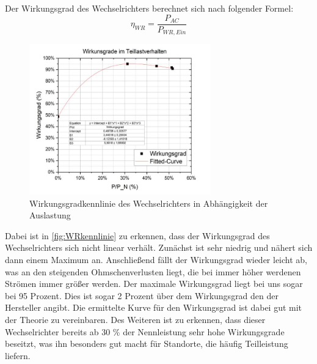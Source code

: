 Der Wirkungsgrad des Wechselrichters berechnet sich nach folgender Formel:
%
\begin{equation}
	\eta_{ WR} = \frac{ P_{AC} }{ P_{WR,Ein} }
	\label{eq:230509_Wirkungsgrad}
\end{equation}
%
%
\begin{figure}[!h]
		\centering
		\includegraphics[width=0.7\textwidth]{Abbildungen/Kennlinie wr}
		\caption{Wirkungsgradkennlinie des Wechselrichters in Abhängigkeit der Auslastung}
		\label{fig:WRkennlinie}
\end{figure}
%
Dabei ist in \autoref{fig:WRkennlinie} zu erkennen, dass der Wirkungsgrad des Wechselrichters sich nicht linear verhält. Zunächst ist sehr niedrig und nähert sich dann einem Maximum an. Anschließend fällt der Wirkungsgrad wieder leicht ab, was an den steigenden Ohmschenverlusten liegt, die bei immer höher werdenen Strömen immer größer werden. Der maximale Wirkungsgrad liegt bei uns sogar bei 95 Prozent. Dies ist sogar 2 Prozent über dem Wirkungsgrad den der Hersteller angibt. Die ermittelte Kurve für den Wirkungsgrad ist dabei gut mit der Theorie zu vereinbaren. Des Weiteren ist zu erkennen, dass dieser Wechselrichter bereits ab 30 \% der Nennleistung sehr hohe Wirkungsgrade beseitzt, was ihn besonders gut macht für Standorte, die häufig Teilleistung liefern.
